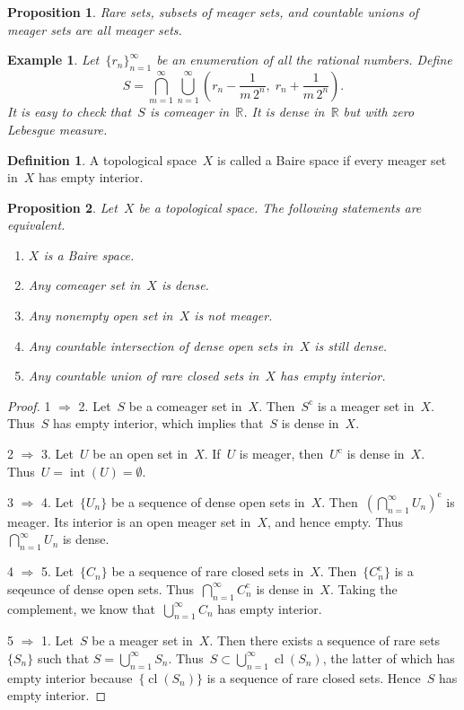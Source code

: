 \documentclass[11pt,a4paper]{article}  %
\newtheorem{proposition}{Proposition}[section]
\newtheorem{example}{Example}[section]
\theoremstyle{definition}
\newtheorem{definition}{Definition}[section]
\def\real{\mathbb{R}}
\newcommand{\co}{{\mathrm{c}}}
\DeclareMathOperator{\inter}{int}
\DeclareMathOperator{\cl}{cl}
\numberwithin{equation}{section}
\begin{document}
\begin{proposition}
 Rare sets, subsets of meager sets, and countable unions of meager sets are all meager sets.
\end{proposition}

\begin{example}
  Let~$\{r_n\}_{n=1}^\infty$ be an enumeration of all the rational numbers.
  Define
  \begin{equation*}
    S = \bigcap_{m=1}^\infty \bigcup_{n=1}^\infty \left(r_n - \frac{1}{m\,2^n},\;
    r_n+\frac{1}{m\,2^n}\right).
  \end{equation*}
  It is easy to check that~$S$ is comeager in~$\real$. It is dense in~$\real$ but with zero Lebesgue measure.
\end{example}


\begin{definition}
  A topological space~$X$ is called a Baire space if every meager set in~$X$ has empty interior.
\end{definition}

\begin{proposition}
    \label{prop:equiv}
   Let~$X$ be a topological space. The following statements are equivalent.
  \begin{enumerate}
    \item $X$ is a Baire space.
    \item Any comeager set in~$X$ is dense.
    \item Any nonempty open set in~$X$ is not meager.
    \item Any countable intersection of dense open sets in~$X$ is still dense.
    \item Any countable union of rare closed sets in~$X$ has empty interior.
\end{enumerate}
\end{proposition}

\begin{proof}
  1 $\Rightarrow$ 2.
  Let~$S$ be a comeager set in~$X$. Then~$S^\co$ is a meager
  set in~$X$. Thus~$S$ has empty interior, which implies that~$S$ is dense in~$X$.

  2 $\Rightarrow$ 3.
  Let~$U$ be an open set in~$X$.
  If~$U$ is meager, then~$U^\co$ is dense in~$X$. Thus~$U=\!\inter(U) \!= \emptyset$.

  3 $\Rightarrow$ 4.
  Let~$\{U_n\}$ be a sequence of dense open sets in~$X$. Then~$(\bigcap_{n=1}^\infty U_n)^\co$ is
  meager. Its interior is an open meager set in~$X$, and hence empty. Thus~$\bigcap_{n=1}^\infty
  U_n$  is dense.

  4 $\Rightarrow$ 5.
  Let~$\{C_n\}$ be a sequence of rare closed sets in~$X$. Then~$\{C_n^\co\}$ is a seqeunce
  of dense open sets. Thus~$\bigcap_{n=1}^\infty C_n^\co$ is dense in~$X$. Taking the complement, we
  know that~$\bigcup_{n=1}^\infty C_n$ has empty interior.

  5 $\Rightarrow$ 1.
  Let~$S$ be a meager set in~$X$. Then there exists a sequence of rare sets~$\{S_n\}$ such that
  $S=\bigcup_{n=1}^\infty S_n$. Thus~$S\subset \bigcup_{n=1}^\infty \cl(S_n)$, the latter of which has
  empty interior because~$\{\cl(S_n)\}$ is a sequence of rare closed sets.
  Hence~$S$ has empty interior.
\end{proof}
\end{document}
